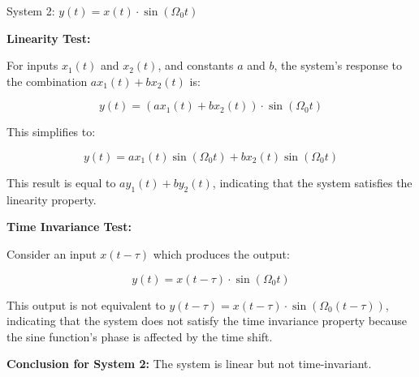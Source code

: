 
\item[b)]
System 2: $y(t)=x(t) \cdot \sin \left(\Omega_{0} t\right)$

\textbf{Linearity Test:}

For inputs $x_1(t)$ and $x_2(t)$, and constants $a$ and $b$, the system's response to the combination
$a x_1(t) + b x_2(t)$ is:

$$
y(t) = (a x_1(t) + b x_2(t)) \cdot \sin(\Omega_0 t)
$$

This simplifies to:

$$
y(t) = a x_1(t) \sin(\Omega_0 t) + b x_2(t) \sin(\Omega_0 t)
$$

This result is equal to $a y_1(t) + b y_2(t)$, indicating that the system satisfies the linearity property.

\textbf{Time Invariance Test:}

Consider an input $x(t - \tau)$ which produces the output:

$$
y(t) = x(t - \tau) \cdot \sin(\Omega_0 t)
$$

This output is not equivalent to $y(t - \tau) = x(t - \tau) \cdot \sin(\Omega_0 (t - \tau))$,
indicating that the system does not satisfy the time invariance property because the sine function's phase
is affected by the time shift.

\textbf{Conclusion for System 2:} The system is linear but not time-invariant.

